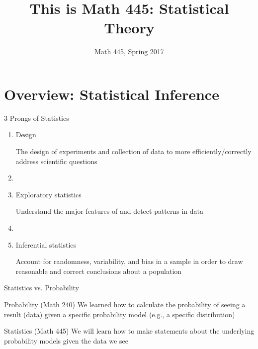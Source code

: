 \documentclass[10pt]{beamer}
\title{This is Math 445: Statistical Theory}
\date{}
\author{Math 445, Spring 2017}
\begin{document}
\maketitle


\section{Overview: Statistical Inference}


\begin{frame}[fragile]{3 Prongs of Statistics}

\begin{enumerate}
\item Design

The design of experiments and collection of data to more efficiently/correctly address scientific questions

\item[]

\item Exploratory statistics

Understand the major features of and detect patterns in data

\item[]

\item Inferential statistics

Account for randomness, variability, and bias in a sample in order to draw reasonable and correct conclusions about a population

\end{enumerate}


\end{frame}


\begin{frame}[fragile]{Statistics vs. Probability}

\begin{alertblock}{Probability (Math 240)}
We learned how to calculate the probability of seeing a result (data) given a specific probability model (e.g., a specific distribution)
\end{alertblock}

\vfill

\begin{alertblock}{Statistics (Math 445)}
We will learn how to make statements about the underlying probability models given the data we see
\end{alertblock}

\end{frame}
\end{document}
